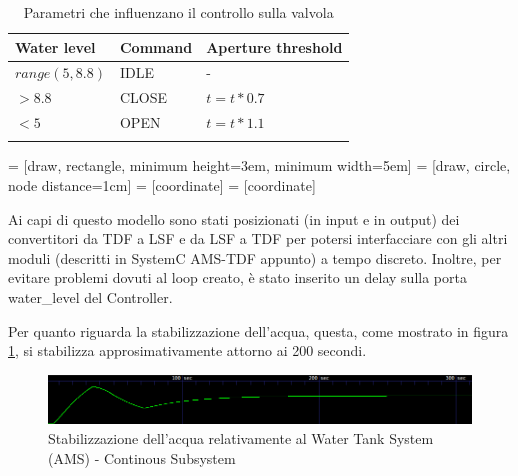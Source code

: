 \documentclass[]{IEEEtran}
\begin{document}
\begin{table}[]
    \centering
    \begin{tabular}{lll}
    \toprule
    Water level     & Command   & Aperture threshold\\ \hline
    $range(5,8.8)$  & IDLE      & - \\
    $>8.8$          & CLOSE     & $t = t * 0.7$\\
    $<5$            & OPEN      & $t = t * 1.1$\\ \bottomrule
    \\
    \end{tabular}
    \caption{Parametri che influenzano il controllo sulla valvola}
    \label{tab:behaviour}
\end{table}  

 = [draw, rectangle, minimum height=3em, minimum width=5em]
 = [draw, circle, node distance=1cm]
 = [coordinate]
 = [coordinate]

Ai capi di questo modello sono stati posizionati (in input e in output) dei convertitori da TDF a LSF e da LSF a TDF per
potersi interfacciare con gli altri moduli (descritti in SystemC AMS-TDF appunto) a tempo discreto.
Inoltre, per evitare problemi dovuti al loop creato, \`e stato inserito un delay sulla porta water\_level del Controller.

Per quanto riguarda la stabilizzazione dell'acqua, questa, come mostrato in figura \ref{fig:water_continuous_system}, 
si stabilizza approsimativamente attorno ai 200 secondi.
\begin{figure}[bt]
	\centering
	\includegraphics[width=0.95\columnwidth]{figures/water_level_continuous_subsystem.png}
	\caption{Stabilizzazione dell'acqua relativamente al Water Tank System (AMS) - Continous Subsystem}
	\label{fig:water_continuous_system}
\end{figure}
\end{document}
